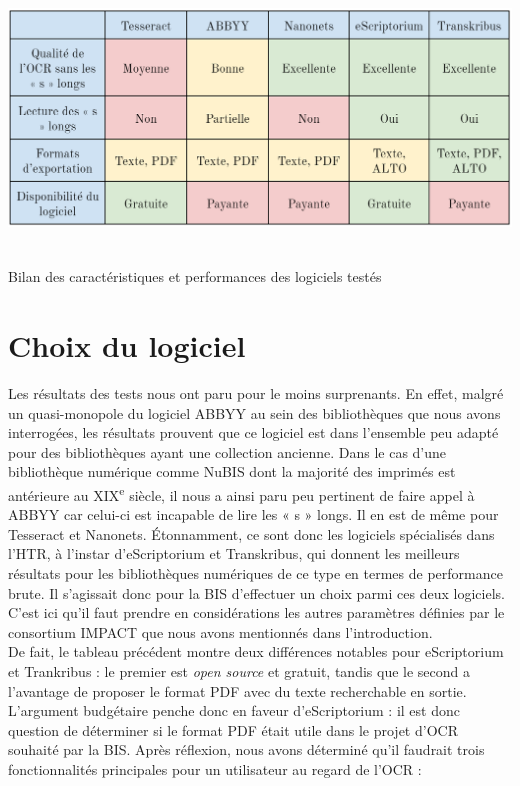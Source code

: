 \documentclass[a4paper,12pt,twoside]{book}
\begin{document}
\begin{table} [H]
	\includegraphics[width=6.26806in,height=2.73611in]{vertopal_157ae480aa4a4b07be198b586a812241/media/image14.png}
	\caption{Bilan des caractéristiques et performances des logiciels testés}
\end{table}


\section{Choix du logiciel}

Les résultats des tests nous ont paru pour le moins surprenants. En
effet, malgré un quasi-monopole du logiciel ABBYY au sein des
bibliothèques que nous avons interrogées, les résultats prouvent que ce
logiciel est dans l'ensemble peu adapté pour des bibliothèques ayant une
collection ancienne. Dans le cas d'une bibliothèque numérique comme
NuBIS dont la majorité des imprimés est antérieure au
XIX\textsuperscript{e} siècle, il nous a ainsi paru peu pertinent de
faire appel à ABBYY car celui-ci est incapable de lire les « s » longs.
Il en est de même pour Tesseract et Nanonets. Étonnamment, ce sont donc
les logiciels spécialisés dans l'HTR, à l'instar d'eScriptorium et
Transkribus, qui donnent les meilleurs résultats pour les bibliothèques
numériques de ce type en termes de performance brute. Il s'agissait donc
pour la BIS d'effectuer un choix parmi ces deux logiciels. C'est ici
qu'il faut prendre en considérations les autres paramètres définies par
le consortium IMPACT que nous avons mentionnés dans l'introduction. \\

De fait, le tableau précédent montre deux différences notables pour
eScriptorium et Trankribus : le premier est \emph{open source} et
gratuit, tandis que le second a l'avantage de proposer le format PDF
avec du texte recherchable en sortie. L'argument
budgétaire penche donc en faveur d'eScriptorium : il est donc question
de déterminer si le format PDF était utile dans le projet d'OCR souhaité
par la BIS. Après réflexion, nous avons déterminé qu'il faudrait trois
fonctionnalités principales pour un utilisateur au regard de l'OCR : \\
\end{document}
